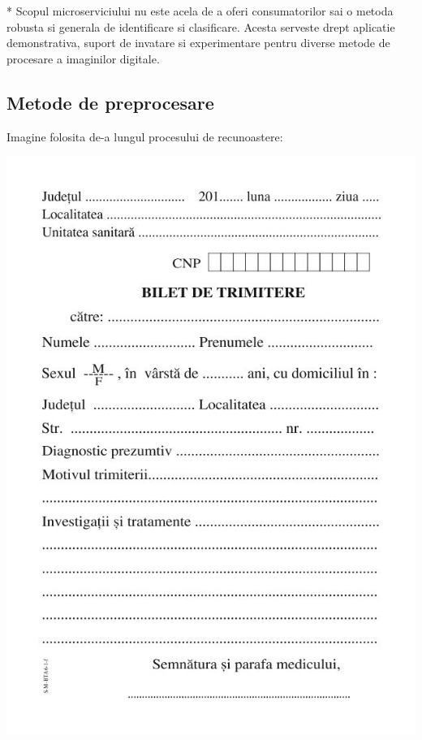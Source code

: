 \documentclass[10pt]{article}
\begin{document}
\> * Scopul microserviciului nu este acela de a oferi consumatorilor sai o metoda robusta si generala de identificare si clasificare. Acesta serveste
drept aplicatie demonstrativa, suport de invatare si experimentare pentru diverse metode de procesare a imaginilor digitale.

\newpage

\subsection{Metode de preprocesare}

Imagine folosita de-a lungul procesului de recunoastere:

\begin{center}

  \includegraphics[scale=0.7]{imagine-analizata.jpg}
  
\end{center}
\end{document}
